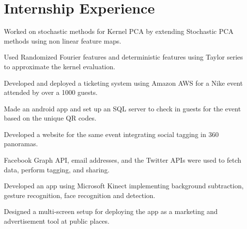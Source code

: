 \documentclass[US paper]{deedy-resume} %
\begin{document}
\vspace{1mm}
\vspace{-2.5pt}

\section{Internship Experience}
\vspace{-4pt}

{
\begin{tightitemize}
\item Worked on stochastic methods for Kernel PCA by extending Stochastic PCA methods using non linear feature maps.
\item Used Randomized Fourier features and deterministic features using Taylor series to approximate the kernel evaluation.
\end{tightitemize}

\vspace{1mm}

\begin{tightitemize}
\item Developed and deployed a ticketing system using Amazon AWS for a Nike event attended by over a 1000 guests.
\item Made an android app and set up an SQL server to check in guests for the event based on the unique QR codes.
\item Developed a website for the same event integrating social tagging in 360 panoramas.
\item Facebook Graph API, email addresses, and the Twitter APIs were used to fetch data, perform tagging, and sharing.

\end{tightitemize}

\vspace{1mm}




\begin{tightitemize}
\item Developed an app using Microsoft Kinect implementing background subtraction, gesture recognition, face recognition and detection.
\item Designed a multi-screen setup for deploying the app as a marketing and advertisement tool at public places.
\end{tightitemize}


}
\end{document}
